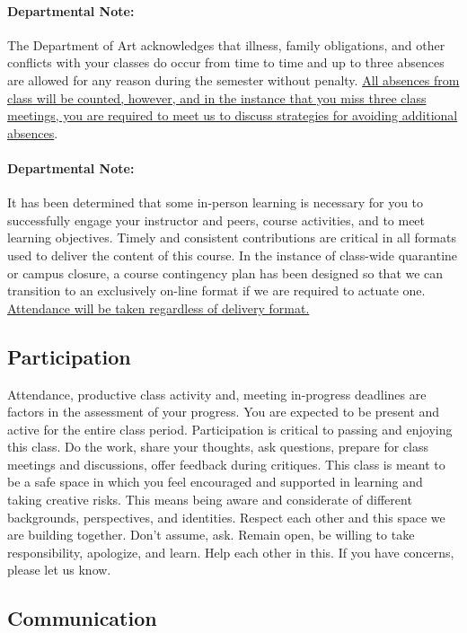 \paragraph{Departmental Note:} The Department of Art acknowledges that illness, family obligations, and other conflicts with your classes do occur from time to time and up to three absences are allowed for any reason during the semester without penalty. \ul{All absences from class will be counted, however, and in the instance that you miss three class meetings, you are required to meet us to discuss strategies for avoiding additional absences}.

\paragraph{Departmental Note:} It has been determined that some in-person learning is necessary for you to successfully engage your instructor and peers, course activities, and to meet learning objectives. Timely and consistent contributions are critical in all formats used to deliver the content of this course. In the instance of class-wide quarantine or campus closure, a course contingency plan has been designed so that we can transition to an exclusively on-line format if we are required to actuate one. \ul{Attendance will be taken regardless of delivery format.}


\subsection{Participation}

Attendance, productive class activity and, meeting in-progress deadlines are factors in the assessment of your progress. You are expected to be present and active for the entire class period. Participation is critical to passing and enjoying this class. Do the work, share your thoughts, ask questions, prepare for class meetings and discussions, offer feedback during critiques. This class is meant to be a safe space in which you feel encouraged and supported in learning and taking creative risks. This means being aware and considerate of different backgrounds, perspectives, and identities. Respect each other and this space we are building together. Don’t assume, ask. Remain open, be willing to take responsibility, apologize, and learn. Help each other in this. If you have concerns, please let us know.

\hypertarget{communication}{%
      \subsection{Communication}}

